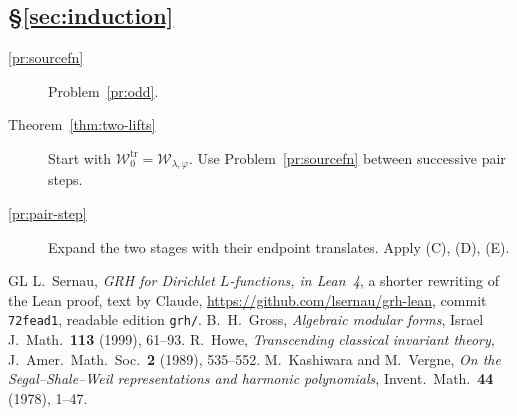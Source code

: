 \documentclass[reqno]{amsart}
\theoremstyle{definition}
\theoremstyle{plain}
\theoremstyle{remark}
\newcommand{\Wc}{\mathcal{W}}
\newcommand{\Wtr}{\Wc^{\mathrm{tr}}}
\begin{document}
\subsection*{\S\ref{sec:induction}}
\begin{description}
\item[\ref{pr:sourcefn}] Problem~\ref{pr:odd}.
\item[Theorem~\ref{thm:two-lifts}] Start with \(\Wtr_0=\Wc_{\lambda,\varphi}\).  Use Problem~\ref{pr:sourcefn} between successive pair steps.
\item[\ref{pr:pair-step}] Expand the two stages with their endpoint translates.  Apply (C), (D), (E).
\end{description}

\begin{thebibliography}{GL}
 L.~Sernau, \emph{GRH for Dirichlet \(L\)-functions, in Lean~4}, a shorter rewriting of the Lean proof, text by Claude, \url{https://github.com/lsernau/grh-lean}, commit \texttt{72fead1}, readable edition \texttt{grh/}.
 B.~H.~Gross, \emph{Algebraic modular forms}, Israel J.\ Math.\ \textbf{113} (1999), 61--93.
 R.~Howe, \emph{Transcending classical invariant theory}, J.\ Amer.\ Math.\ Soc.\ \textbf{2} (1989), 535--552.
 M.~Kashiwara and M.~Vergne, \emph{On the Segal--Shale--Weil representations and harmonic polynomials}, Invent.\ Math.\ \textbf{44} (1978), 1--47.
\end{thebibliography}
\end{document}
